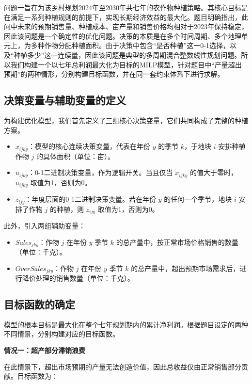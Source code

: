 \documentclass[withoutpreface,bwprint]{cumcmthesis} %
\begin{document}
问题一旨在为该乡村规划2024年至2030年共七年的农作物种植策略。其核心目标是在满足一系列种植规则的前提下，实现长期经济效益的最大化。题目明确指出，此问中未来的预期销售量、种植成本、亩产量和销售价格均相对于2023年保持稳定，因此该问题是一个确定性的优化问题。决策的本质是在多个时间周期、多个地理单元上，为多种作物分配种植面积。由于决策中包含“是否种植”这一0-1选择，以及“种植多少”这一连续量，因此该问题是典型的多周期混合整数线性规划问题。所以我们构建一个以七年总利润最大化为目标的MILP模型，针对题目中“产量超出预期”的两种情形，分别构建目标函数，并在同一套约束体系下进行求解。

\subsection{决策变量与辅助变量的定义}

为构建优化模型，我们首先定义了三组核心决策变量，它们共同构成了完整的种植方案。
\begin{itemize}
	\item $x_{ijky}$：模型的核心连续决策变量，代表在年份 $y$ 的季节 $k$，于地块 $i$ 安排种植作物 $j$ 的具体面积（单位：亩）。
	\item $u_{ijky}$：0-1二进制决策变量，作为逻辑开关。当且仅当 $x_{ijky}$ 的值大于零时，$u_{ijky}$ 取值为1，否则为0。
	\item $z_{ijy}$：年度层面的0-1二进制决策变量。若在年份 $y$ 的任何一个季节，地块 $i$ 安排了作物 $j$ 的种植，则 $z_{ijy}$ 取值为1，否则为0。
\end{itemize}

此外，引入两组辅助变量：
\begin{itemize}
	\item $Sales_{jky}$：作物 $j$ 在年份 $y$ 季节 $k$ 的总产量中，按正常市场价格销售的数量（单位：千克）。
	\item $OverSales_{jky}$：作物 $j$ 在年份 $y$ 季节 $k$ 的总产量中，超出预期市场需求后，进行降价处理的销售数量（单位：千克）。
\end{itemize}

\subsection{目标函数的确定}

模型的根本目标是最大化在整个七年规划期内的累计净利润。根据题目设定的两种不同情景，分别构建对应的目标函数。

\textbf{情况一：超产部分滞销浪费}

在此情景下，超出市场预期的产量无法创造价值，因此总收益仅由正常销售部分贡献。目标函数为：
\end{document}
